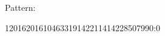 


Pattern: {\tt \pattern}

\def\datetimedata{{1}{2016}{2016}{10}{46}{3}{319}{14}{2}{2}{1}{14}{14}{2}{2}{8}{50}{799}{0:0}}

\expandafter\texosqueryfmtdatetime\expandafter\pattern
 \datetimedata

\bye
